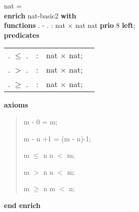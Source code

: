 \begin{tabbing}\label{nat-spec}%
nat = \\
{\bf enr}\={\bf ich} nat-basic2 {\bf with}\+\\
{\bf functions} . - .  : nat $\times$ nat \Imp  nat  {\bf prio} 8 {\bf left};\\
{\bf pred}\={\bf icates}\+\\
\begin{tabular}{lcll}
. $\le$ . & : & nat $\times$ nat;\\
. $>$ . & : & nat $\times$ nat;\\
. $\ge$ . & : & nat $\times$ nat;
\end{tabular}\-
\end{tabbing}
{\bf axioms}



\begin{quote}
m - 0 = m;

m - n +1 = (m - n)-1;

m $\le$ n \Equiv \Not n $<$ m;

m $>$ n \Equiv n $<$ m;

m $\ge$ n \Equiv \Not m $<$ n;


\end{quote}
{\bf end enrich}

